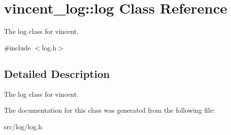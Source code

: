 \hypertarget{classvincent__log_1_1log}{}\section{vincent\+\_\+log\+:\+:log Class Reference}
\label{classvincent__log_1_1log}


The log class for vincent.  




{\ttfamily \#include $<$log.\+h$>$}



\subsection{Detailed Description}
The log class for vincent. 

The documentation for this class was generated from the following file\+:\begin{DoxyCompactItemize}
\item 
src/log/log.\+h\end{DoxyCompactItemize}

